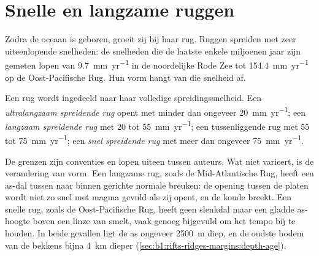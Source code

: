 \section{Snelle en langzame ruggen}

Zodra de oceaan is geboren, groeit zij bij haar rug. Ruggen spreiden met zeer uiteenlopende snelheden: de snelheden die de laatste enkele miljoenen jaar zijn gemeten lopen van \qty{9.7}{mm.yr^{-1}} in de noordelijke Rode Zee tot \qty{154.4}{mm.yr^{-1}} op de Oost-Pacifische Rug. Hun vorm hangt van die snelheid af.

\begin{definition}\label{def:b1:rifts-ridges-margins:ridge-classes}
Een rug wordt ingedeeld naar haar volledige spreidingssnelheid. Een \emph{ultralangzaam spreidende rug} opent met minder dan ongeveer \qty{20}{mm.yr^{-1}}; een \emph{langzaam spreidende rug} met 20 tot \qty{55}{mm.yr^{-1}}; een tussenliggende rug met 55 tot \qty{75}{mm.yr^{-1}}; een \emph{snel spreidende rug} met meer dan ongeveer \qty{75}{mm.yr^{-1}}.
\end{definition}

De grenzen zijn conventies en lopen uiteen tussen auteurs. Wat niet varieert, is de verandering van vorm. Een langzame rug, zoals de Mid-Atlantische Rug, heeft een as-dal tussen naar binnen gerichte normale breuken: de opening tussen de platen wordt niet zo snel met magma gevuld als zij opent, en de koude  breekt. Een snelle rug, zoals de Oost-Pacifische Rug, heeft geen slenkdal maar een gladde as-hoogte boven een linze van smelt, vaak genoeg bijgevuld om het tempo bij te houden. In beide gevallen ligt de as ongeveer \qty{2500}{m} diep, en de oudste bodem van de bekkens bijna \qty{4}{km} dieper (\cref{sec:b1:rifts-ridges-margins:depth-age}).

